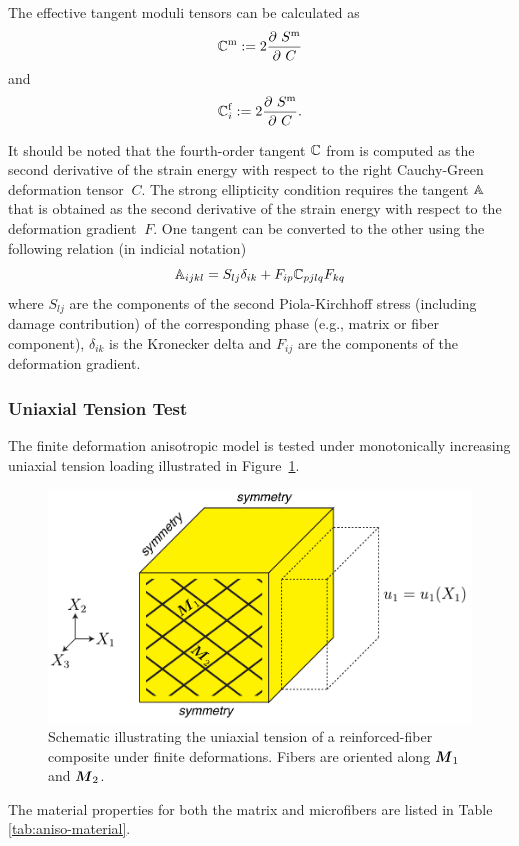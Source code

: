 \documentclass[12pt]{article}
\newcommand{\mtrx}{{\text{m}}}
\newcommand{\fiber}{{\text{f}}}
\numberwithin{equation}{section}
\begin{document}
The effective tangent moduli tensors can be calculated as
\begin{equation}\label{eq:aniso-tangent1}
  \bbC^\mtrx
  :=
  2 \frac{\partial ~S^\mtrx}{\partial~C}
\end{equation}
and
\begin{equation}\label{eq:aniso-tangent2}
  \bbC^\fiber_i
  :=
  2 \frac{\partial ~S^\mtrx}{\partial~C}.
\end{equation}

It should be noted that the fourth-order tangent $\mathbb{C}$ from
 is computed as the second derivative of the
strain energy with respect to the right Cauchy-Green deformation
tensor $~C$. The strong ellipticity condition
 requires the tangent $\mathbb{A}$ that is
obtained as the second derivative of the strain energy with respect to
the deformation gradient $~F$. One tangent can be converted to the
other using the following relation (in indicial notation)
\begin{equation}\label{eq:aniso-tangent3}
  \mathbb{A}_{ijkl} = S_{lj} \delta_{ik}
    + F_{ip} \mathbb{C}_{pjlq} F_{kq}
\end{equation}
where $S_{lj}$ are the components of the second Piola-Kirchhoff stress
(including damage contribution) of the corresponding phase (e.g.,
matrix or fiber component), $\delta_{ik}$ is the Kronecker delta and
$F_{ij}$ are the components of the deformation gradient.

\subsubsection{Uniaxial Tension Test}

The finite deformation anisotropic model is tested under monotonically
increasing uniaxial tension loading illustrated in
Figure~\ref{fig:composite_tension}.
\begin{figure}[!htbp]
 \centering
 \includegraphics[width=120mm]{figs/composite_tension_schematic.pdf}
 \caption{Schematic illustrating the uniaxial tension of a
   reinforced-fiber composite under finite deformations. Fibers are
   oriented along ${\boldsymbol{M}}_{1}$ and ${\boldsymbol{M}}_{2}$.}
     \label{fig:composite_tension}
\end{figure}
The material properties for both
the matrix and microfibers are listed in Table~
\ref{tab:aniso-material}.
\end{document}
